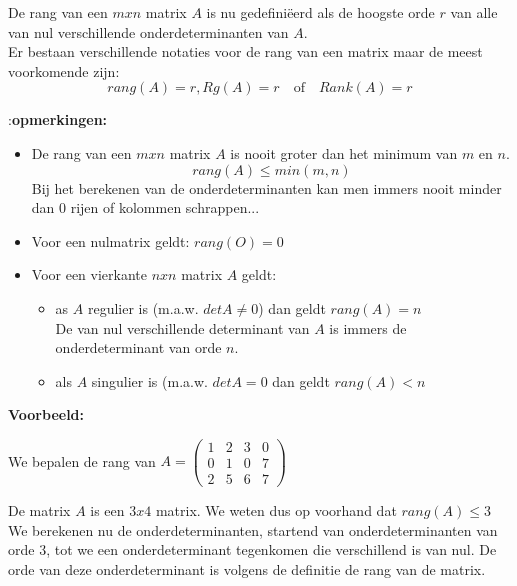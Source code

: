 De rang van een $mxn$ matrix $A$ is nu gedefini\"{e}erd als de hoogste orde $r$ van alle van nul verschillende onderdeterminanten van $A$.\\

Er bestaan verschillende notaties voor de rang van een matrix maar de meest voorkomende zijn:\\ 

\[ rang(A)=r, Rg(A)=r  \quad \textrm{of} \quad Rank(A)=r \]

{:\bf opmerkingen:}

\begin{itemize}
	\item De rang van een $mxn$ matrix $A$ is nooit groter dan het minimum van $m$ en $n$. 
	\[ rang(A) \leq min(m,n)  \]
	Bij het berekenen van de onderdeterminanten kan men immers nooit minder dan $0$ rijen of kolommen schrappen...
	\item Voor een nulmatrix geldt: $rang(O)=0$
	\item Voor een vierkante $nxn$ matrix $A$ geldt:
		\begin{itemize}
			\item as $A$ regulier is (m.a.w. $det A \neq 0$) dan geldt $rang(A)=n$\\
			De van nul verschillende determinant van $A$ is immers de onderdeterminant van orde $n$.
			\item als $A$ singulier is (m.a.w. $det A =0$ dan geldt $rang(A)<n$
		\end{itemize}
\end{itemize}

{\bf Voorbeeld:}

We bepalen de rang van $A=\left( \begin{matrix}
1 & 2 & 3 & 0\\
0 & 1 & 0 & 7\\
2 & 5 & 6 & 7
\end{matrix} \right)$ 

De matrix $A$ is een $3x4$ matrix. We weten dus op voorhand dat $rang(A)\leq 3$\\

We berekenen nu de onderdeterminanten, startend van onderdeterminanten van orde $3$, tot we een onderdeterminant tegenkomen die verschillend is van nul. De orde van deze onderdeterminant is volgens de definitie de rang van de matrix.\\

